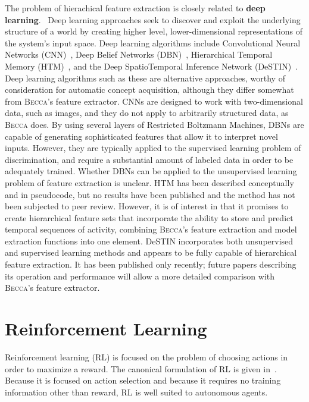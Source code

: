 The problem of hierachical feature extraction is closely related to {\bf deep learning}.~\cite{arel10} Deep learning approaches seek to discover and exploit the underlying structure of a world by creating higher level, lower-dimensional representations of the system's input space. Deep learning algorithms include Convolutional Neural Networks (CNN)~\cite{lecun98}, Deep Belief Networks (DBN)~\cite{hinton06,fasel10b}, Hierarchical Temporal Memory (HTM)~\cite{hawkins11}, and the Deep SpatioTemporal Inference Network (DeSTIN)~\cite{arel09}. Deep learning algorithms such as these are alternative approaches, worthy of consideration for automatic concept acquisition, although they differ somewhat from \textsc{Becca}'s feature extractor. CNNs are designed to work with two-dimensional data, such as images, and they do not apply to arbitrarily structured data, as \textsc{Becca} does. By using several layers of Restricted Boltzmann Machines, DBNs are capable of generating sophisticated features that allow it to interpret novel inputs. However, they are typically applied to the supervised learning problem of discrimination, and require a substantial amount of labeled data in order to be adequately trained. Whether DBNs can be applied to the unsupervised learning problem of feature extraction is unclear. HTM has been described conceptually and in pseudocode, but no results have been published and the method has not been subjected to peer review. However, it is of interest in that it promises to create hierarchical feature sets that incorporate the ability to store and predict temporal sequences of activity, combining \textsc{Becca}'s feature extraction and model extraction functions into one element. DeSTIN incorporates both unsupervised and supervised learning methods and appears to be fully capable of hierarchical feature extraction. It has been published only recently; future papers describing its operation and performance will allow a more detailed comparison with \textsc{Becca}'s feature extractor.


\section{Reinforcement Learning}
Reinforcement learning (RL) is focused on the problem of choosing actions in order to maximize a reward. The canonical formulation of RL is given in~\cite{sutton98}. Because it is focused on action selection and because it requires no training information other than reward, RL is well suited to autonomous agents.

